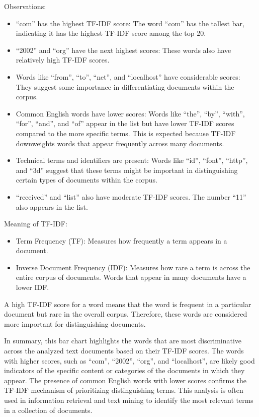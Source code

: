 Observations:
\begin{itemize}
    \item ``com'' has the highest TF-IDF score: The word ``com'' has the tallest bar, indicating it has the highest TF-IDF score among the top 20.
    \item ``2002'' and ``org'' have the next highest scores: These words also have relatively high TF-IDF scores.
    \item Words like ``from'', ``to'', ``net'', and ``localhost'' have considerable scores: They suggest some importance in differentiating documents within the corpus.
    \item Common English words have lower scores: Words like ``the'', ``by'', ``with'', ``for'', ``and'', and ``of'' appear in the list but have lower TF-IDF scores compared to the more specific terms.
    This is expected because TF-IDF downweights words that appear frequently across many documents.
    \item Technical terms and identifiers are present: Words like ``id'', ``font'', ``http'', and ``3d'' suggest that these terms might be important in distinguishing certain types of documents within the corpus.
    \item ``received'' and ``list'' also have moderate TF-IDF scores.
    The number ``11'' also appears in the list.
\end{itemize}

Meaning of TF-IDF:
\begin{itemize}
    \item Term Frequency (TF): Measures how frequently a term appears in a document.
    \item Inverse Document Frequency (IDF): Measures how rare a term is across the entire corpus of documents.
    Words that appear in many documents have a lower IDF.
\end{itemize}

A high TF-IDF score for a word means that the word is frequent in a particular document but rare in the overall corpus.
Therefore, these words are considered more important for distinguishing documents.

In summary, this bar chart highlights the words that are most discriminative across the analyzed text documents based on their TF-IDF scores.
The words with higher scores, such as ``com'', ``2002'', ``org'', and ``localhost'', are likely good indicators of the specific content or categories of the documents in which they appear.
The presence of common English words with lower scores confirms the TF-IDF mechanism of prioritizing distinguishing terms.
This analysis is often used in information retrieval and text mining to identify the most relevant terms in a collection of documents.